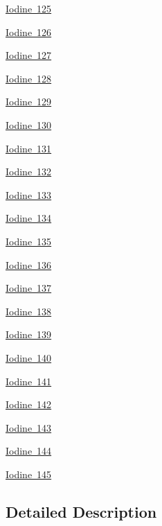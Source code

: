 \begin{DoxyCompactItemize}
\mbox{\hyperlink{group___isotope_const-_iodine-_i125}{Iodine 125}}
\item 
\mbox{\hyperlink{group___isotope_const-_iodine-_i126}{Iodine 126}}
\item 
\mbox{\hyperlink{group___isotope_const-_iodine-_i127}{Iodine 127}}
\item 
\mbox{\hyperlink{group___isotope_const-_iodine-_i128}{Iodine 128}}
\item 
\mbox{\hyperlink{group___isotope_const-_iodine-_i129}{Iodine 129}}
\item 
\mbox{\hyperlink{group___isotope_const-_iodine-_i130}{Iodine 130}}
\item 
\mbox{\hyperlink{group___isotope_const-_iodine-_i131}{Iodine 131}}
\item 
\mbox{\hyperlink{group___isotope_const-_iodine-_i132}{Iodine 132}}
\item 
\mbox{\hyperlink{group___isotope_const-_iodine-_i133}{Iodine 133}}
\item 
\mbox{\hyperlink{group___isotope_const-_iodine-_i134}{Iodine 134}}
\item 
\mbox{\hyperlink{group___isotope_const-_iodine-_i135}{Iodine 135}}
\item 
\mbox{\hyperlink{group___isotope_const-_iodine-_i136}{Iodine 136}}
\item 
\mbox{\hyperlink{group___isotope_const-_iodine-_i137}{Iodine 137}}
\item 
\mbox{\hyperlink{group___isotope_const-_iodine-_i138}{Iodine 138}}
\item 
\mbox{\hyperlink{group___isotope_const-_iodine-_i139}{Iodine 139}}
\item 
\mbox{\hyperlink{group___isotope_const-_iodine-_i140}{Iodine 140}}
\item 
\mbox{\hyperlink{group___isotope_const-_iodine-_i141}{Iodine 141}}
\item 
\mbox{\hyperlink{group___isotope_const-_iodine-_i142}{Iodine 142}}
\item 
\mbox{\hyperlink{group___isotope_const-_iodine-_i143}{Iodine 143}}
\item 
\mbox{\hyperlink{group___isotope_const-_iodine-_i144}{Iodine 144}}
\item 
\mbox{\hyperlink{group___isotope_const-_iodine-_i145}{Iodine 145}}
\end{DoxyCompactItemize}


\subsection{Detailed Description}

